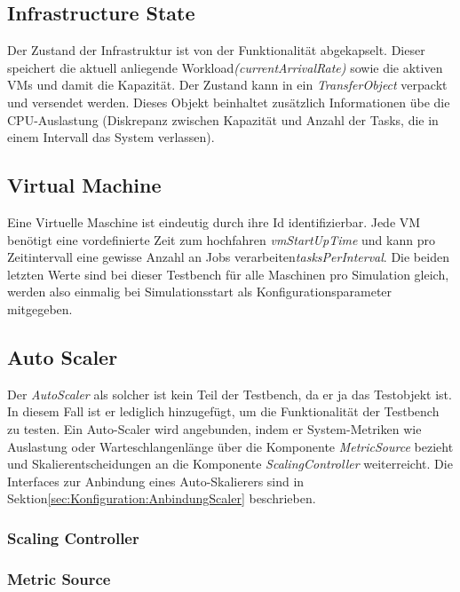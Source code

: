 \subsection{Infrastructure State}
\label{sec:aufbau:State}
Der Zustand der Infrastruktur ist von der Funktionalität abgekapselt. Dieser speichert die aktuell anliegende Workload\textit{(currentArrivalRate)} sowie die aktiven VMs und damit die Kapazität. Der Zustand kann in ein \textit{TransferObject} verpackt und versendet werden. Dieses Objekt beinhaltet zusätzlich Informationen übe die CPU-Auslastung (Diskrepanz zwischen Kapazität und Anzahl der Tasks, die in einem Intervall das System verlassen).

\subsection{Virtual Machine}
\label{sec:aufbau:VM}
Eine Virtuelle Maschine ist eindeutig durch ihre Id identifizierbar. Jede VM benötigt eine vordefinierte Zeit zum hochfahren \textit{vmStartUpTime} und kann pro Zeitintervall eine gewisse Anzahl an Jobs verarbeiten\textit{tasksPerInterval}. Die beiden letzten Werte sind bei dieser Testbench für alle Maschinen pro Simulation gleich, werden also einmalig bei Simulationsstart als Konfigurationsparameter mitgegeben.




\subsection{Auto Scaler}
Der \textit{AutoScaler} als solcher ist kein Teil der Testbench, da er ja das Testobjekt ist. In diesem Fall ist er lediglich hinzugefügt, um die Funktionalität der Testbench zu testen. Ein Auto-Scaler wird angebunden, indem er System-Metriken wie Auslastung oder Warteschlangenlänge über die Komponente \textit{MetricSource} bezieht und Skalierentscheidungen an die Komponente \textit{ScalingController} weiterreicht. Die Interfaces zur Anbindung eines Auto-Skalierers sind in Sektion\ref{sec:Konfiguration:AnbindungScaler} beschrieben.



\subsubsection{Scaling Controller}

\subsubsection{Metric Source}




